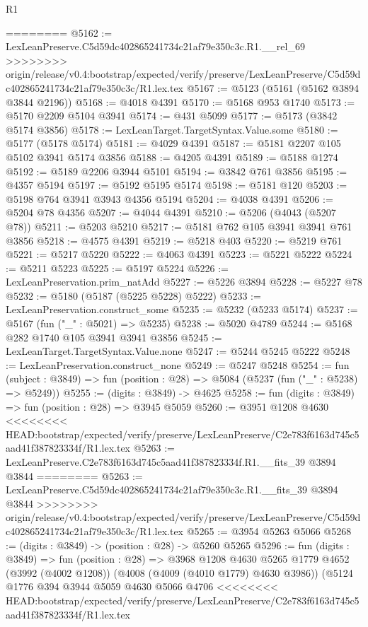 \begin{lexlean}{R1}
\begin{coremodule}
{{{{{{{{{{{{{{{{{{{{{{{{{{{{{{{{{{{{{{{{{{{{{{{{{{{{{{{{{{{{{{{{{{{{{{{{{{{{{{{{{{{{{{{{{{{{{{{{{{{{{{{{{{{{{{{{{{{{{{{{{{{{{{{{{{{{{{{{{{{{{{{{{{{{{{{{{{{{{{{{{{{{{{{{{{{{{{{{{{{{{{{{{{========
@5162 := LexLeanPreserve.C5d59dc402865241734c21af79e350c3c.R1.__rel_69
>>>>>>>> origin/release/v0.4:bootstrap/expected/verify/preserve/LexLeanPreserve/C5d59dc402865241734c21af79e350c3c/R1.lex.tex
@5167 := @5123 (@5161 (@5162 @3894 @3844 @2196))
@5168 := @4018 @4391
@5170 := @5168 @953 @1740
@5173 := @5170 @2209 @5104 @3941
@5174 := @431 @5099
@5177 := @5173 (@3842 @5174 @3856)
@5178 := LexLeanTarget.TargetSyntax.Value.some
@5180 := @5177 (@5178 @5174)
@5181 := @4029 @4391
@5187 := @5181 @2207 @105 @5102 @3941 @5174 @3856
@5188 := @4205 @4391
@5189 := @5188 @1274
@5192 := @5189 @2206 @3944 @5101
@5194 := @3842 @761 @3856
@5195 := @4357 @5194
@5197 := @5192 @5195 @5174
@5198 := @5181 @120
@5203 := @5198 @764 @3941 @3943 @4356 @5194
@5204 := @4038 @4391
@5206 := @5204 @78 @4356
@5207 := @4044 @4391
@5210 := @5206 (@4043 (@5207 @78))
@5211 := @5203 @5210
@5217 := @5181 @762 @105 @3941 @3941 @761 @3856
@5218 := @4575 @4391
@5219 := @5218 @403
@5220 := @5219 @761
@5221 := @5217 @5220
@5222 := @4063 @4391
@5223 := @5221 @5222
@5224 := @5211 @5223
@5225 := @5197 @5224
@5226 := LexLeanPreservation.prim_natAdd
@5227 := @5226 @3894
@5228 := @5227 @78
@5232 := @5180 (@5187 (@5225 @5228) @5222)
@5233 := LexLeanPreservation.construct_some
@5235 := @5232 (@5233 @5174)
@5237 := @5167 (fun ("_" : @5021) => @5235)
@5238 := @5020 @4789
@5244 := @5168 @282 @1740 @105 @3941 @3941 @3856
@5245 := LexLeanTarget.TargetSyntax.Value.none
@5247 := @5244 @5245 @5222
@5248 := LexLeanPreservation.construct_none
@5249 := @5247 @5248
@5254 := fun (subject : @3849) => fun (position : @28) => @5084 (@5237 (fun ("_" : @5238) => @5249))
@5255 := (digits : @3849) -> @4625
@5258 := fun (digits : @3849) => fun (position : @28) => @3945 @5059
@5260 := @3951 @1208 @4630
<<<<<<<< HEAD:bootstrap/expected/verify/preserve/LexLeanPreserve/C2e783f6163d745c5aad41f387823334f/R1.lex.tex
@5263 := LexLeanPreserve.C2e783f6163d745c5aad41f387823334f.R1.__fits_39 @3894 @3844
========
@5263 := LexLeanPreserve.C5d59dc402865241734c21af79e350c3c.R1.__fits_39 @3894 @3844
>>>>>>>> origin/release/v0.4:bootstrap/expected/verify/preserve/LexLeanPreserve/C5d59dc402865241734c21af79e350c3c/R1.lex.tex
@5265 := @3954 @5263 @5066
@5268 := (digits : @3849) -> (position : @28) -> @5260 @5265
@5296 := fun (digits : @3849) =>
  fun (position : @28) =>
  @3968
    @1208
    @4630
    @5265
    @1779
    @4652
    (@3992 (@4002 @1208))
    (@4008 (@4009 (@4010 @1779) @4630 @3986))
    (@5124
      @1776
      @394
      @3944
      @5059
      @4630
      @5066
      @4706
<<<<<<<< HEAD:bootstrap/expected/verify/preserve/LexLeanPreserve/C2e783f6163d745c5aad41f387823334f/R1.lex.tex
}}}}}}}}}}}}}}}}}}}}}}}}}}}}}}}}}}}}}}}}}}}}}}}}}}}}}}}}}}}}}}}}}}}}}}}}}}}}}}}}}}}}}}}}}}}}}}}}}}}}}}}}}}}}}}}}}}}}}}}}}}}}}}}}}}}}}}}}}}}}}}}}}}}}}}}}}}}}}}}}}}}}}}}}}}}}}}}}}}}}}}}}}}
\end{coremodule}
\end{lexlean}
